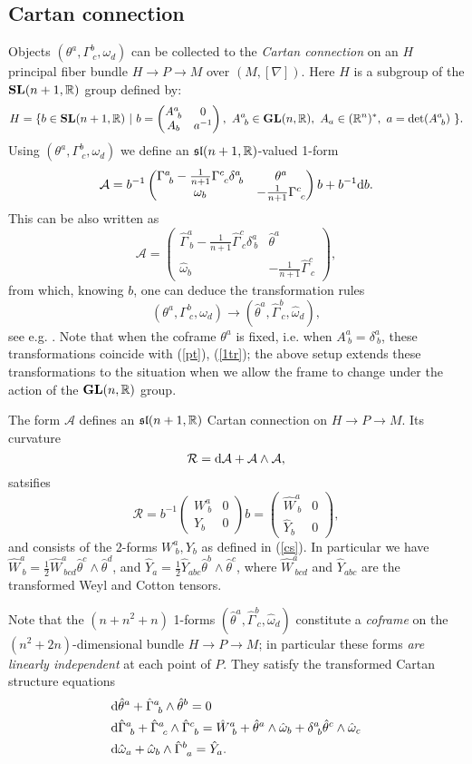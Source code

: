 \documentclass[letterpaper]{amsart}
\theoremstyle{definition}
\theoremstyle{remark}
\newcommand{\be}{\begin{equation}}
\newcommand{\ee}{\end{equation}}
\newcommand{\dz}{\wedge}
\newcommand{\der}{{\rm d}}
\newcommand{\bma}{\begin{pmatrix}}
\newcommand{\ema}{\end{pmatrix}}
\begin{document}
\subsection{Cartan connection}\label{ser}
Objects $(\theta^a,\Gamma^b_{~c},\omega_d)$ can be collected to the
  \emph{Cartan connection} on an $H$ principal fiber bundle $H\to P\to
  M$ over
  $(M,[\nabla])$. Here $H$ is a subgroup of the $\mathbf{SL}(n+1,\mathbb{R})$ group
  defined by:
$$H=\{ b\in\slg(n+1,\bbR)~|~b=\bma
  A^a_{~b}&0\\A_b&a^{-1}\ema,~A^a_{~b}\in\glg(n,\bbR),~A_a\in
  (\bbR^n)^*, ~a=\det(A^a_{~b})~\}.$$
Using $(\theta^a,\Gamma^b_{~c},\omega_d)$ we define an
$\mathfrak{sl}(n+1,\mathbb{R})$-valued 1-form
$$
{\mathcal A}=b^{-1}\bma\Gamma^a_{~b}-\frac{1}{n+1}\Gamma^c_{~c}\delta^a_{~b}&\theta^a\\\omega_b&-\frac{1}{n+1}\Gamma^c_{~c}\ema b+b^{-1}\der b.
$$  
This can be also written as 
$${\mathcal
  A}=\bma\hat{\Gamma}^a_{~b}-\frac{1}{n+1}\hat{\Gamma}^c_{~c}\delta^a_{~b}&\hat{\theta}^a\\\hat{\omega}_b&-\frac{1}{n+1}\hat{\Gamma}^c_{~c}\ema,$$
from which, knowing $b$, one can deduce the transformation rules
$$(\theta^a,\Gamma^b_{~c},\omega_d)\to
(\hat{\theta}^a,\hat{\Gamma}^b_{~c},\hat{\omega}_d),$$ 
see e.g. \cite{nn}. Note that when the coframe $\theta^a$ is fixed,
i.e. when $A^a_{~b}=\delta^a_{~b}$, these transformations coincide
with (\ref{pt}), (\ref{1tr}); the above setup extends these 
transformations to the situation when we allow the frame to change
under the action of the $\mathbf{GL}(n,\mathbb{R})$ group. 


The form $\mathcal A$ defines an $\mathfrak{sl}(n+1,\mathbb{R})$
Cartan connection on $H\to P\to M$. Its curvature
$${\mathcal R}=\der{\mathcal A}+{\mathcal A}\dz{\mathcal A},$$
satsifies 
$${\mathcal R}=b^{-1}\bma W^a_{~b}&0\\Y_b&0\ema b=\bma \hat{W}^a_{~b}&0\\\hat{Y}_b&0\ema,$$
and consists of the 2-forms $W^a_{~b}, Y_{b}$ as defined in
(\ref{cs}). In particular we have
$\hat{W}^a_{~b}=\tfrac12\hat{W}^a_{~bcd}\hat{\theta}^c\dz\hat{\theta}^d$,
and
$\hat{Y}_{a}=\tfrac12\hat{Y}_{abc}\hat{\theta}^b\dz\hat{\theta}^c$,
where $\hat{W}^a_{~bcd}$ and $\hat{Y}_{abc}$ are the transformed Weyl
and Cotton tensors.


Note that the $(n+n^2+n)$
1-forms $(\hat{\theta}^a,\hat{\Gamma}^b_{~c},\hat{\omega}_d)$
constitute a \emph{coframe} on the $(n^2+2n)$-dimensional bundle $H\to P\to M$; in particular these forms \emph{are linearly
independent} at each point of $P$. They satisfy the transformed Cartan
structure equations
\be\begin{aligned}
&\der\hat{\theta}^a+\hat{\Gamma}^a_{~b}\dz\hat{\theta}^b=0\\
&\der\hat{\Gamma}^a_{~b}+\hat{\Gamma}^a_{~c}\dz\hat{\Gamma}^c_{~b}=
\hat{W}^a_{~b}+\hat{\theta}^a\dz\hat{\omega}_b+\delta^a_{~b}\hat{\theta}^c\dz\hat{\omega}_c\\
&\der\hat{\omega}_a+\hat{\omega}_b\dz\hat{\Gamma}^b_{~a}=\hat{Y}_a.
\end{aligned}\label{cst}\ee 
\end{document}
